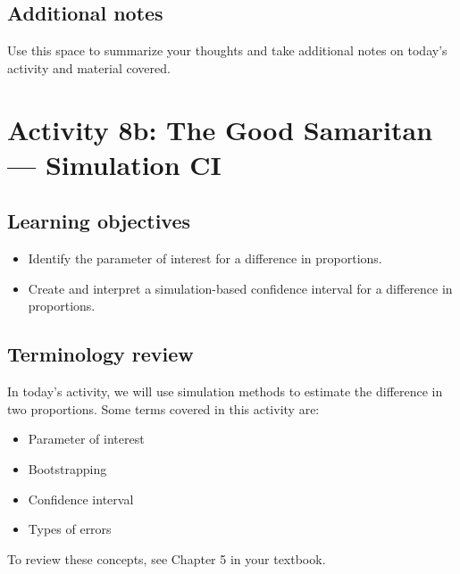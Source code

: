 \documentclass[
]{report}
\begin{document}
\hypertarget{additional-notes-11}{%
\subsection{Additional notes}\label{additional-notes-11}}

Use this space to summarize your thoughts and take additional notes on today's activity and material covered.

\newpage

\hypertarget{activity-8b-the-good-samaritan-simulation-ci}{%
\section{Activity 8b: The Good Samaritan --- Simulation CI}\label{activity-8b-the-good-samaritan-simulation-ci}}


\hypertarget{learning-objectives-11}{%
\subsection{Learning objectives}\label{learning-objectives-11}}

\begin{itemize}
\item
  Identify the parameter of interest for a difference in proportions.
\item
  Create and interpret a simulation-based confidence interval for a difference in proportions.
\end{itemize}

\hypertarget{terminology-review-13}{%
\subsection{Terminology review}\label{terminology-review-13}}

In today's activity, we will use simulation methods to estimate the difference in two proportions. Some terms covered in this activity are:

\begin{itemize}
\item
  Parameter of interest
\item
  Bootstrapping
\item
  Confidence interval
\item
  Types of errors
\end{itemize}

To review these concepts, see Chapter 5 in your textbook.
\end{document}
